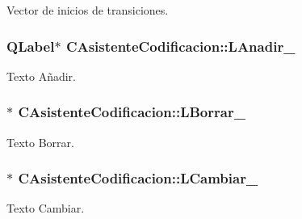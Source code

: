 Vector de inicios de transiciones. 

\subsubsection[{\texorpdfstring{L\+Anadir\+\_\+}{LAnadir_}}]{\setlength{\rightskip}{0pt plus 5cm}Q\+Label$\ast$ C\+Asistente\+Codificacion\+::\+L\+Anadir\+\_\+\hspace{0.3cm}{\ttfamily [private]}}\hypertarget{classCAsistenteCodificacion_acd2847b7726990965a4e5aa5d5278805}{}\label{classCAsistenteCodificacion_acd2847b7726990965a4e5aa5d5278805}


Texto Añadir. 

\subsubsection[{\texorpdfstring{L\+Borrar\+\_\+}{LBorrar_}}]{$\ast$ C\+Asistente\+Codificacion\+::\+L\+Borrar\+\_\+\hspace{0.3cm}{\ttfamily [private]}}\hypertarget{classCAsistenteCodificacion_a2820e2c5c034ae5641b3c0a927921be9}{}\label{classCAsistenteCodificacion_a2820e2c5c034ae5641b3c0a927921be9}


Texto Borrar. 

\subsubsection[{\texorpdfstring{L\+Cambiar\+\_\+}{LCambiar_}}]{$\ast$ C\+Asistente\+Codificacion\+::\+L\+Cambiar\+\_\+\hspace{0.3cm}{\ttfamily [private]}}\hypertarget{classCAsistenteCodificacion_af6fcb3e27669afa7b4cc3a3916e90ea3}{}\label{classCAsistenteCodificacion_af6fcb3e27669afa7b4cc3a3916e90ea3}


Texto Cambiar. 

